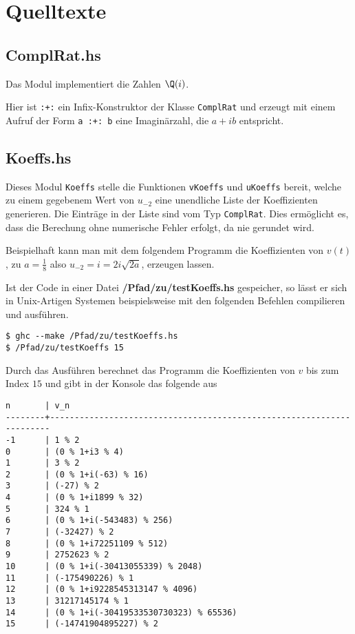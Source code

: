 \chapter{Quelltexte}

\section{ComplRat.hs}
Das Modul  implementiert die Zahlen $\Q(i)$.

Hier ist \texttt{:+:} ein Infix-Konstruktor der Klasse \texttt{ComplRat} und
erzeugt mit einem Aufruf der Form \texttt{a :+: b} eine Imaginärzahl, die
$a+ib$ entspricht.

\section{Koeffs.hs} \label{sec:Koeffs.hs}
Dieses Modul \texttt{Koeffs} stelle die Funktionen \texttt{vKoeffs} und
\texttt{uKoeffs} bereit, welche zu einem gegebenem Wert von $u_{-2}$ eine
unendliche Liste der Koeffizienten generieren. Die Einträge in der Liste sind
vom Typ \texttt{ComplRat}.
Dies ermöglicht es, dass die Berechung ohne numerische Fehler erfolgt, da nie
gerundet wird.

Beispielhaft kann man mit dem folgendem Programm die Koeffizienten von $v(t)$,
zu $a=\frac{1}{8}$ also $u_{-2}=i=2i\sqrt{2a}$, erzeugen lassen.

Ist der Code in einer Datei \textbf{/Pfad/zu/testKoeffs.hs} gespeicher, so
lässt er sich in Unix-Artigen Systemen beispielsweise mit den folgenden
Befehlen compilieren und ausführen.
\begin{lstlisting}[style=Bash]
$ ghc --make /Pfad/zu/testKoeffs.hs
$ /Pfad/zu/testKoeffs 15
\end{lstlisting}
Durch das Ausführen berechnet das Programm die Koeffizienten von $v$ bis zum
Index $15$ und gibt in der Konsole das folgende aus
\begin{lstlisting}[style=Bash]
n       | v_n
--------+----------------------------------------------------------------------
-1      | 1 % 2
0       | (0 % 1+i3 % 4)
1       | 3 % 2
2       | (0 % 1+i(-63) % 16)
3       | (-27) % 2
4       | (0 % 1+i1899 % 32)
5       | 324 % 1
6       | (0 % 1+i(-543483) % 256)
7       | (-32427) % 2
8       | (0 % 1+i72251109 % 512)
9       | 2752623 % 2
10      | (0 % 1+i(-30413055339) % 2048)
11      | (-175490226) % 1
12      | (0 % 1+i9228545313147 % 4096)
13      | 31217145174 % 1
14      | (0 % 1+i(-30419533530730323) % 65536)
15      | (-14741904895227) % 2
\end{lstlisting}
